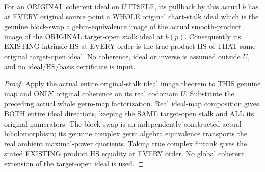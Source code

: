 \begin{theorem}
\label{hir:actual-target-open-block-projection-whole-stalk-product-hs}
\leanok
For an ORIGINAL coherent ideal on $U$ ITSELF, its pullback by this actual
$b$ has at EVERY original source point a WHOLE original chart-stalk ideal
which is the genuine block-swap algebra-equivalence image of the actual
smooth-product image of the ORIGINAL target-open stalk ideal at $b(p)$.
Consequently its EXISTING intrinsic HS at EVERY order is the true product
HS of THAT same original target-open ideal. No coherence, ideal or inverse
is assumed outside $U$, and no ideal/HS/basis certificate is input.
\end{theorem}
\begin{proof}
Apply the actual entire original-stalk ideal image theorem to THIS genuine
map and ONLY original coherence on its real codomain $U$. Substitute the
preceding actual whole germ-map factorization. Real ideal-map composition
gives BOTH entire ideal directions, keeping the SAME target-open stalk and
ALL its original numerators. The block swap is an independently constructed
actual biholomorphism; its genuine complex germ algebra equivalence
transports the real ambient maximal-power quotients. Taking true complex
finrank gives the stated EXISTING product HS equality at EVERY order.
No global coherent extension of the target-open ideal is used.
\end{proof}

